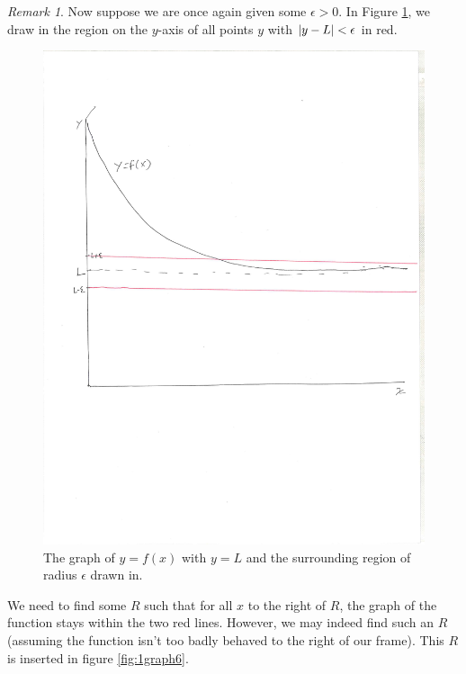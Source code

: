 \documentclass[english]{book}
\DeclarePairedDelimiter\abs{\lvert}{\rvert}%
\theoremstyle{remark}
\newtheorem{remark}{Remark}[theorem]
\theoremstyle{definition}
\newtheorem*{next week}{Next Week}
\begin{document}
\begin{remark}
Now suppose we are once again given some $\epsilon>0$. In Figure \ref{fig:1graph5}, we draw in the region on the $y$-axis of all points $y$ with $\abs{y-L}<\epsilon$ in red.
\begin{figure}[h!]\centering
	\includegraphics[scale=0.5,trim={0 3.3in 12mm 36mm},clip]{1graph5} \caption{The graph of $y=f(x)$ with $y=L$ and the surrounding region of radius $\epsilon$ drawn in.\label{fig:1graph5}}
\end{figure}
\newpage
We need to find some $R$ such that for all $x$ to the right of $R$, the graph of the function stays within the two red lines. However, we may indeed find such an $R$ (assuming the function isn't too badly behaved to the right of our frame). This $R$ is inserted in figure \ref{fig:1graph6}.


\end{remark}
\end{document}
